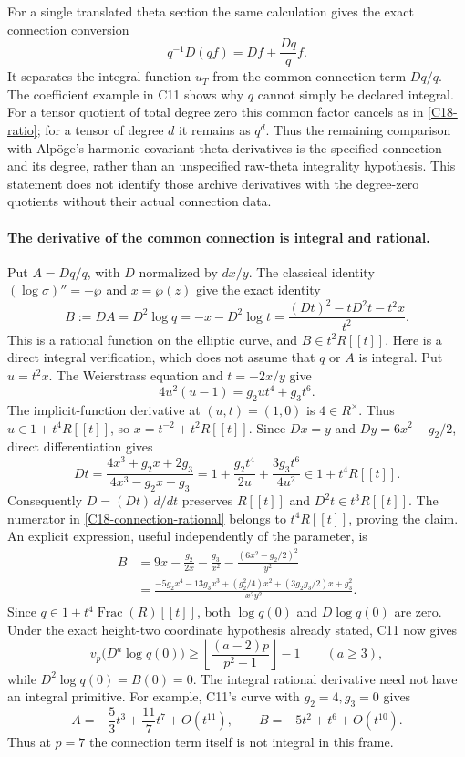 For a single translated theta section the same calculation gives
the exact connection conversion
\[
 q^{-1}D(qf)=Df+\frac{Dq}{q}f.
\]
It separates the integral function $u_T$ from the common connection
term $Dq/q$. The coefficient example in C11 shows why $q$ cannot
simply be declared integral. For a tensor quotient of total degree
zero this common factor cancels as in \eqref{C18-ratio}; for a
tensor of degree $d$ it remains as $q^d$. Thus the remaining
comparison with Alp\"oge's harmonic covariant theta derivatives
is the specified connection and its degree, rather than an
unspecified raw-theta integrality hypothesis. This statement does
not identify those archive derivatives with the degree-zero
quotients without their actual connection data.

\paragraph{The derivative of the common connection is integral and rational.}
Put $A=Dq/q$, with $D$ normalized by $dx/y$.  The classical identity
$(\log\sigma)''=-\wp$ and $x=\wp(z)$ give the exact identity
\begin{equation}\label{C18-connection-rational}
 B:=DA=D^2\log q=-x-D^2\log t
   =\frac{(Dt)^2-tD^2t-t^2x}{t^2}.
\end{equation}
This is a rational function on the elliptic curve, and
$B\in t^2R[[t]]$.  Here is a direct integral verification, which does
not assume that $q$ or $A$ is integral.  Put $u=t^2x$.  The Weierstrass
equation and $t=-2x/y$ give
\[
 4u^2(u-1)=g_2u t^4+g_3t^6.
\]
The implicit-function derivative at $(u,t)=(1,0)$ is $4\in R^\times$.
Thus $u\in1+t^4R[[t]]$, so $x=t^{-2}+t^2R[[t]]$.
Since $Dx=y$ and $Dy=6x^2-g_2/2$, direct differentiation gives
\[
 Dt=\frac{4x^3+g_2x+2g_3}{4x^3-g_2x-g_3}
    =1+\frac{g_2t^4}{2u}+\frac{3g_3t^6}{4u^2}
       \in1+t^4R[[t]].
\]
Consequently $D=(Dt)\,d/dt$ preserves $R[[t]]$ and
$D^2t\in t^3R[[t]]$.  The numerator in
\eqref{C18-connection-rational} belongs to $t^4R[[t]]$, proving the
claim.  An explicit expression, useful independently of the parameter,
is
\begin{align*}
 B&=9x-\frac{g_2}{2x}-\frac{g_3}{x^2}
       -\frac{(6x^2-g_2/2)^2}{y^2}\\
  &=\frac{-5g_2x^4-13g_3x^3+(g_2^2/4)x^2
                +(3g_2g_3/2)x+g_3^2}{x^2y^2}.
\end{align*}
Since $q\in1+t^4\operatorname{Frac}(R)[[t]]$, both
$\log q(0)$ and $D\log q(0)$ are zero.  Under the exact height-two
coordinate hypothesis already stated, C11 now gives
\[
 v_p\bigl(D^a\log q(0)\bigr)
   \geq\left\lfloor\frac{(a-2)p}{p^2-1}\right\rfloor-1
       \qquad(a\geq3),
\]
while $D^2\log q(0)=B(0)=0$.
The integral rational derivative need not have an integral primitive.
For example, C11's curve with $g_2=4,g_3=0$ gives
\[
 A=-\frac53t^3+\frac{11}{7}t^7+O(t^{11}),\qquad
 B=-5t^2+t^6+O(t^{10}).
\]
Thus at $p=7$ the connection term itself is not integral in this frame.

